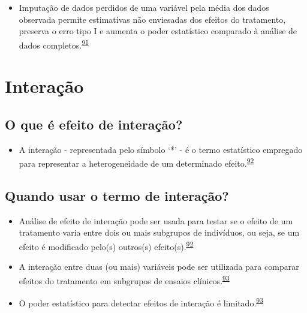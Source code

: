 \documentclass[
]{book}
\providecommand{\tightlist}{%
  \setlength{\itemsep}{0pt}\setlength{\parskip}{0pt}}
\begin{document}
\begin{itemize}
\tightlist
\item
  Imputação de dados perdidos de uma variável pela média dos dados observada permite estimativas não enviesadas dos efeitos do tratamento, preserva o erro tipo I e aumenta o poder estatístico comparado à análise de dados completos.\textsuperscript{\protect\hyperlink{ref-Kahan2014}{91}}
\end{itemize}

\hypertarget{interacao}{%
\section{Interação}\label{interacao}}

\hypertarget{o-que-uxe9-efeito-de-interauxe7uxe3o}{%
\subsection{O que é efeito de interação?}\label{o-que-uxe9-efeito-de-interauxe7uxe3o}}

\begin{itemize}
\tightlist
\item
  A interação - representada pelo símbolo `*' - é o termo estatístico empregado para representar a heterogeneidade de um determinado efeito.\textsuperscript{\protect\hyperlink{ref-Altman1996}{92}}
\end{itemize}

\hypertarget{quando-usar-o-termo-de-interauxe7uxe3o}{%
\subsection{Quando usar o termo de interação?}\label{quando-usar-o-termo-de-interauxe7uxe3o}}

\begin{itemize}
\item
  Análise de efeito de interação pode ser usada para testar se o efeito de um tratamento varia entre dois ou mais subgrupos de indivíduos, ou seja, se um efeito é modificado pelo(s) outros(s) efeito(s).\textsuperscript{\protect\hyperlink{ref-Altman1996}{92}}
\item
  A interação entre duas (ou mais) variáveis pode ser utilizada para comparar efeitos do tratamento em subgrupos de ensaios clínicos.\textsuperscript{\protect\hyperlink{ref-Altman2003}{93}}
\item
  O poder estatístico para detectar efeitos de interação é limitado.\textsuperscript{\protect\hyperlink{ref-Altman2003}{93}}
\end{itemize}
\end{document}
